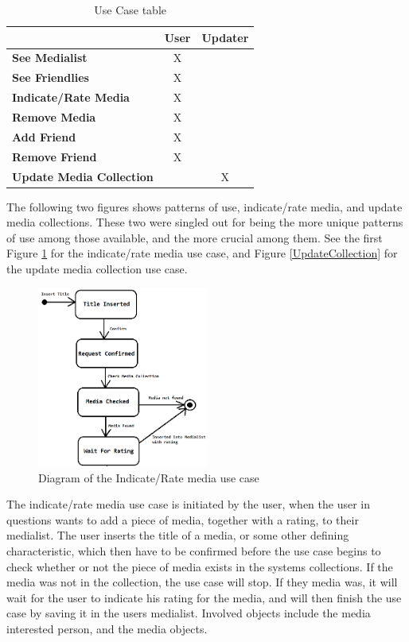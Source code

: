 \begin{table}[htb]
\centering
\begin{tabular}{|l|c|c|} \hline
	  & \textbf{User} & \textbf{Updater} \\ \hline
	\textbf{See Medialist} & X &  \\ \hline
	\textbf{See Friendlies} & X &  \\ \hline
	\textbf{Indicate/Rate Media} & X &  \\ \hline
	\textbf{Remove Media} & X &  \\ \hline
	\textbf{Add Friend} & X &  \\ \hline
	\textbf{Remove Friend} & X &  \\ \hline
	\textbf{Update Media Collection} &  & X \\ \hline
\end{tabular}
\caption{Use Case table}
\label{UseTable}
\end{table}

The following two figures shows patterns of use, indicate/rate media, and update media collections. These two were singled out for being the more unique patterns of use among those available, and the more crucial among them. See the first Figure \ref{IndicateMedia} for the indicate/rate media use case, and Figure \ref{UpdateCollection} for the update media collection use case.

\begin{figure}[htb]
\centering
\includegraphics[width=0.5\textwidth]{Images/IndicateMedia.png}
\caption{Diagram of the Indicate/Rate media use case}
\label{IndicateMedia}
\end{figure}

The indicate/rate media use case is initiated by the user, when the user in questions wants to add a piece of media, together with a rating, to their medialist. The user inserts the title of a media, or some other defining characteristic, which then have to be confirmed before the use case begins to check whether or not the piece of media exists in the systems collections. If the media was not in the collection, the use case will stop. If they media was, it will wait for the user to indicate his rating for the media, and will then finish the use case by saving it in the users medialist. Involved objects include the media interested person, and the media objects.

